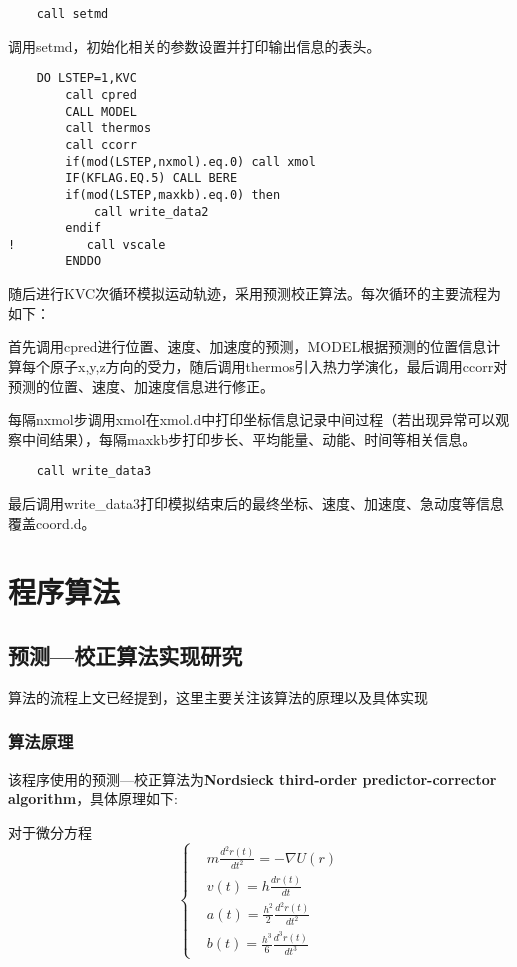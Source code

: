 \documentclass[UTF-8]{ctexart}
\begin{document}
\begin{verbatim}
    call setmd
\end{verbatim}
调用setmd，初始化相关的参数设置并打印输出信息的表头。
\begin{verbatim}
    DO LSTEP=1,KVC
        call cpred  
        CALL MODEL 
        call thermos 
        call ccorr
        if(mod(LSTEP,nxmol).eq.0) call xmol
        IF(KFLAG.EQ.5) CALL BERE
        if(mod(LSTEP,maxkb).eq.0) then
            call write_data2 
        endif  
!          call vscale 
        ENDDO
\end{verbatim}
随后进行KVC次循环模拟运动轨迹，采用预测校正算法。每次循环的主要流程为如下：

首先调用cpred进行位置、速度、加速度的预测，MODEL根据预测的位置信息计算每个原子x,y,z方向的受力，随后调用thermos引入热力学演化，最后调用ccorr对预测的位置、速度、加速度信息进行修正。

每隔nxmol步调用xmol在xmol.d中打印坐标信息记录中间过程（若出现异常可以观察中间结果），每隔maxkb步打印步长、平均能量、动能、时间等相关信息。

\begin{verbatim}
    call write_data3
\end{verbatim}
最后调用write\_data3打印模拟结束后的最终坐标、速度、加速度、急动度等信息覆盖coord.d。

\section{程序算法}

\subsection{预测—校正算法实现研究}

算法的流程上文已经提到，这里主要关注该算法的原理以及具体实现

\subsubsection{算法原理}

该程序使用的预测—校正算法为\textbf{Nordsieck third-order predictor-corrector algorithm}，具体原理如下:

对于微分方程
\begin{equation}
    \left\{
    \begin{aligned}
         & m\frac{d^2r(t)}{dt^2} = -\nabla U(r)     \\
         & v(t) = h\frac{dr(t)}{dt}                 \\
         & a(t) = \frac{h^2}{2}\frac{d^2r(t)}{dt^2} \\
         & b(t) = \frac{h^3}{6}\frac{d^3r(t)}{dt^3}
    \end{aligned}
    \right.
\end{equation}
\end{document}
